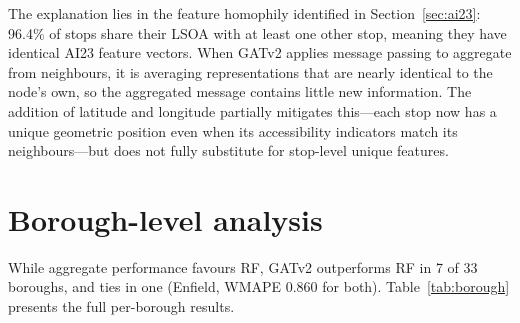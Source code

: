 \documentclass[12pt,a4paper]{report}
\begin{document}
The explanation lies in the feature homophily identified in
Section~\ref{sec:ai23}: 96.4\% of stops share their LSOA with at least one
other stop, meaning they have identical AI23 feature vectors. When GATv2 applies
message passing to aggregate from neighbours, it is averaging representations
that are nearly identical to the node's own, so the aggregated message contains
little new information. The addition of latitude and longitude partially
mitigates this---each stop now has a unique geometric position even when its
accessibility indicators match its neighbours---but does not fully substitute
for stop-level unique features.
\label{sec:homophily}

\section{Borough-level analysis}
\label{sec:borough}
While aggregate performance favours RF, GATv2 outperforms RF in 7 of 33
boroughs, and ties in one (Enfield, WMAPE 0.860 for both). Table~\ref{tab:borough}
presents the full per-borough results.
\end{document}
